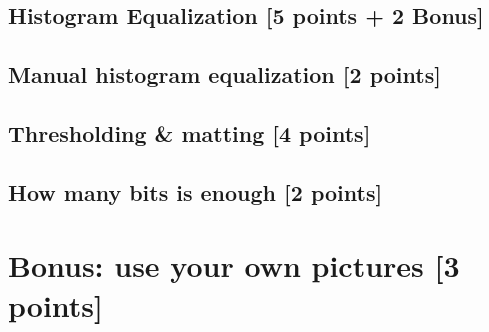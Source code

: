 \documentclass[tikz,14pt,fleqn]{article}
\begin{document}
\subsection{Histogram Equalization [5 points + 2 Bonus]}


\subsection{Manual histogram equalization [2 points]}


\subsection{Thresholding \& matting [4 points]}


\subsection{How many bits is enough [2 points]}


\section{Bonus: use your own pictures [3 points]}
\end{document}
